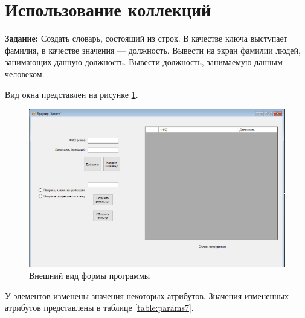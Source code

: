 \section{Использование коллекций}

\textbf{Задание:} Создать словарь, состоящий из строк. В качестве ключа выступает фамилия, в качестве значения — должность. Вывести на экран фамилии людей, занимающих данную должность. 
Вывести должность, занимаемую данным человеком.

Вид окна представлен на рисунке \ref{fig:task7_form}.
\begin{figure}[H]
    \centering
    \includegraphics[scale=0.7]{task7/form.png}
    \caption{Внешний вид формы программы}
    \label{fig:task7_form}
\end{figure}

У элементов изменены значения некоторых атрибутов. 
Значения измененных атрибутов представлены в таблице \ref{table:params7}.

